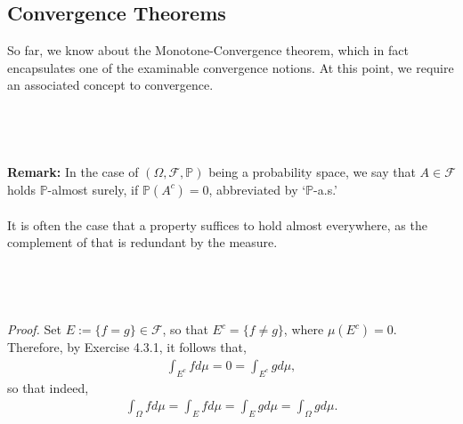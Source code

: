 \documentclass{article}
\begin{document}
\subsection{Convergence Theorems}
So far, we know about the Monotone-Convergence theorem, which in fact encapsulates one of the examinable convergence notions. At this point, we require an associated concept to convergence.\\\\
\noindent{}\\\\\\
\textbf{Remark:} In the case of $(\Omega,\mathcal{F},\mathbb{P})$ being a probability space, we say that $A\in\mathcal{F}$ holds $\mathbb{P}$-almost surely, if $\mathbb{P}(A^c) = 0$, abbreviated by ‘$\mathbb{P}$-a.s.’ \\\\
It is often the case that a property suffices to hold almost everywhere, as the complement of that  is redundant by the measure.\\\\
\noindent{}\\\\\\
\textit{Proof.} Set $E := \{f=g\} \in \mathcal{F}$, so that $E^c = \{f \neq g\}$, where $\mu(E^c) = 0$. Therefore, by Exercise 4.3.1, it follows that,
\begin{eqnarray}
\nonumber
\int_{E^c} f d\mu = 0 = \int_{E^c} g d\mu,
\end{eqnarray}
so that indeed,
\begin{eqnarray}
\nonumber
\int_\Omega f d\mu = \int_E f d\mu = \int_E g d\mu = \int_\Omega g d\mu.
\end{eqnarray}
\end{document}
